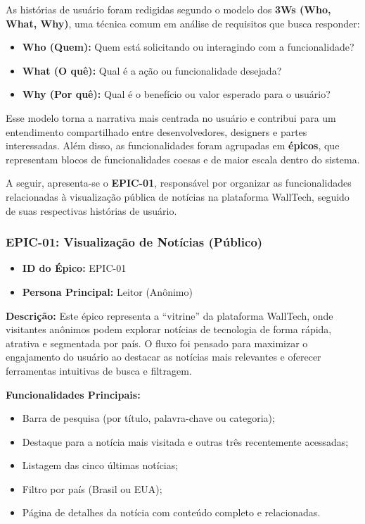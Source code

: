 As histórias de usuário foram redigidas segundo o modelo dos \textbf{3Ws (Who, What, Why)}, uma técnica comum em análise de requisitos que busca responder:
\begin{itemize}
  \item \textbf{Who (Quem):} Quem está solicitando ou interagindo com a funcionalidade?
  \item \textbf{What (O quê):} Qual é a ação ou funcionalidade desejada?
  \item \textbf{Why (Por quê):} Qual é o benefício ou valor esperado para o usuário?
\end{itemize}

Esse modelo torna a narrativa mais centrada no usuário e contribui para um entendimento compartilhado entre desenvolvedores, designers e partes interessadas. Além disso, as funcionalidades foram agrupadas em \textbf{épicos}, que representam blocos de funcionalidades coesas e de maior escala dentro do sistema.

A seguir, apresenta-se o \textbf{EPIC-01}, responsável por organizar as funcionalidades relacionadas à visualização pública de notícias na plataforma WallTech, seguido de suas respectivas histórias de usuário.

\subsubsection*{EPIC-01: Visualização de Notícias (Público)}

\begin{itemize}
  \item \textbf{ID do Épico:} EPIC-01
  \item \textbf{Persona Principal:} Leitor (Anônimo)
\end{itemize}

\noindent \textbf{Descrição:} Este épico representa a “vitrine” da plataforma WallTech, onde visitantes anônimos podem explorar notícias de tecnologia de forma rápida, atrativa e segmentada por país. O fluxo foi pensado para maximizar o engajamento do usuário ao destacar as notícias mais relevantes e oferecer ferramentas intuitivas de busca e filtragem.

\noindent \textbf{Funcionalidades Principais:}
\begin{itemize}
  \item Barra de pesquisa (por título, palavra-chave ou categoria);
  \item Destaque para a notícia mais visitada e outras três recentemente acessadas;
  \item Listagem das cinco últimas notícias;
  \item Filtro por país (Brasil ou EUA);
  \item Página de detalhes da notícia com conteúdo completo e relacionadas.
\end{itemize}


